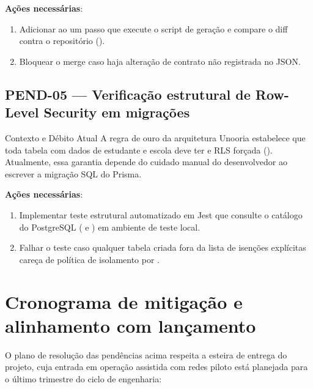 \textbf{Ações necessárias}:
\begin{enumerate}
  \item Adicionar ao  um passo que execute o script de
    geração e compare o diff contra o repositório ().
  \item Bloquear o merge caso haja alteração de contrato não registrada no JSON.
\end{enumerate}

\subsection{PEND-05 — Verificação estrutural de Row-Level Security em migrações}

\begin{especificacao}{Contexto e Débito Atual}
A regra de ouro da arquitetura Unooria estabelece que toda tabela com dados de
estudante e escola deve ter  e RLS forçada ().
Atualmente, essa garantia depende do cuidado manual do desenvolvedor ao escrever a
migração SQL do Prisma.
\end{especificacao}

\textbf{Ações necessárias}:
\begin{enumerate}
  \item Implementar teste estrutural automatizado em Jest que consulte o catálogo do
    PostgreSQL ( e ) em ambiente de teste local.
  \item Falhar o teste caso qualquer tabela criada fora da lista de isenções explícitas
    careça de política de isolamento por .
\end{enumerate}

\section{Cronograma de mitigação e alinhamento com lançamento}

O plano de resolução das pendências acima respeita a esteira de entrega do projeto,
cuja entrada em operação assistida com redes piloto está planejada para o último
trimestre do ciclo de engenharia:

